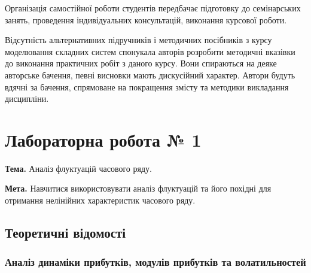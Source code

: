 \documentclass[
  letterpaper,
]{report}
\begin{document}
Організація самостійної роботи студентів передбачає підготовку до
семінарських занять, проведення індивідуальних консультацій, виконання
курсової роботи.

Відсутність альтернативних підручників і методичних посібників з курсу
моделювання складних систем спонукала авторів розробити методичні
вказівки до виконання практичних робіт з даного курсу. Вони спираються
на деяке авторське бачення, певні висновки мають дискусійний характер.
Автори будуть вдячні за бачення, спрямоване на покращення змісту та
методики викладання дисципліни.


\hypertarget{ux43bux430ux431ux43eux440ux430ux442ux43eux440ux43dux430-ux440ux43eux431ux43eux442ux430-1}{%
\chapter{Лабораторна робота №
1}\label{ux43bux430ux431ux43eux440ux430ux442ux43eux440ux43dux430-ux440ux43eux431ux43eux442ux430-1}}

\textbf{Тема.} Аналіз флуктуацій часового ряду.

\textbf{Мета.} Навчитися використовувати аналіз флуктуацій та його
похідні для отримання нелінійних характеристик часового ряду.

\hypertarget{ux442ux435ux43eux440ux435ux442ux438ux447ux43dux456-ux432ux456ux434ux43eux43cux43eux441ux442ux456}{%
\section{Теоретичні
відомості}\label{ux442ux435ux43eux440ux435ux442ux438ux447ux43dux456-ux432ux456ux434ux43eux43cux43eux441ux442ux456}}

\hypertarget{ux430ux43dux430ux43bux456ux437-ux434ux438ux43dux430ux43cux456ux43aux438-ux43fux440ux438ux431ux443ux442ux43aux456ux432-ux43cux43eux434ux443ux43bux456ux432-ux43fux440ux438ux431ux443ux442ux43aux456ux432-ux442ux430-ux432ux43eux43bux430ux442ux438ux43bux44cux43dux43eux441ux442ux435ux439}{%
\subsection{Аналіз динаміки прибутків, модулів прибутків та
волатильностей}\label{ux430ux43dux430ux43bux456ux437-ux434ux438ux43dux430ux43cux456ux43aux438-ux43fux440ux438ux431ux443ux442ux43aux456ux432-ux43cux43eux434ux443ux43bux456ux432-ux43fux440ux438ux431ux443ux442ux43aux456ux432-ux442ux430-ux432ux43eux43bux430ux442ux438ux43bux44cux43dux43eux441ux442ux435ux439}}
\end{document}
